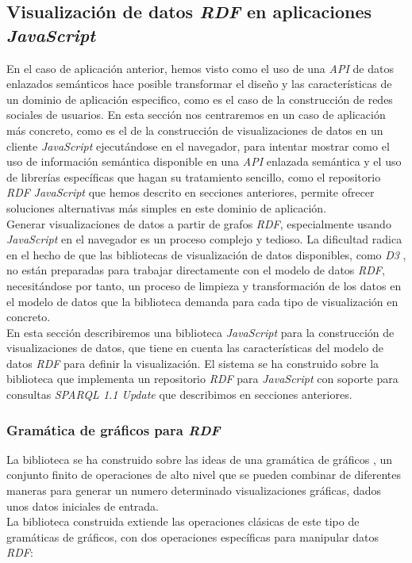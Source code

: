 \subsection{Visualizaci\'on de datos \textit{RDF} en aplicaciones \textit{JavaScript}}

En el caso de aplicaci\'on anterior, hemos visto como el uso de una \textit{API} de datos enlazados sem\'anticos hace posible transformar el dise\~no y las caracter\'isticas de un dominio de aplicaci\'on especifico, como es el caso de la construcci\'on de redes sociales de usuarios. En esta secci\'on nos centraremos en un caso de aplicaci\'on m\'as concreto, como es el de la construcci\'on de visualizaciones de datos en un cliente \textit{JavaScript} ejecut\'andose en el navegador, para intentar mostrar como el uso de informaci\'on sem\'antica disponible en una \textit{API} enlazada sem\'antica y el uso de librer\'ias espec\'ificas que hagan su tratamiento sencillo, como el repositorio \textit{RDF} \textit{JavaScript} que hemos descrito en secciones anteriores, permite ofrecer soluciones alternativas m\'as simples en este dominio de aplicaci\'on.\\
Generar visualizaciones de datos a partir de grafos \textit{RDF}, especialmente usando \textit{JavaScript} en el navegador es un proceso complejo y tedioso. La dificultad radica en el hecho de que las bibliotecas de visualizaci\'on de datos disponibles, como \textit{D3} \cite{d3}, no est\'an preparadas para trabajar directamente con el modelo de datos \textit{RDF}, necesit\'andose por tanto, un proceso de limpieza y transformaci\'on de los datos en el modelo de datos que la biblioteca demanda para cada tipo de visualizaci\'on en concreto.\\
En esta secci\'on describiremos una biblioteca \textit{JavaScript} para la construcci\'on de visualizaciones de datos, que tiene en cuenta las caracter\'isticas del modelo de datos \textit{RDF} para definir la visualizaci\'on. El sistema se ha construido sobre la biblioteca que implementa un repositorio \textit{RDF} para \textit{JavaScript} con soporte para consultas \textit{SPARQL 1.1 Update} que describimos en secciones anteriores.

\subsubsection{Gram\'atica de gr\'aficos para \textit{RDF}}

La biblioteca se ha construido sobre las ideas de una gram\'atica de gr\'aficos \cite{wilkinson2012grammar}, un conjunto finito de operaciones de alto nivel que se pueden combinar de diferentes maneras para generar un numero determinado visualizaciones gr\'aficas, dados unos datos iniciales de entrada.\\
La biblioteca construida extiende las operaciones cl\'asicas de este tipo de gram\'aticas de gr\'aficos,  con dos operaciones espec\'ificas para manipular datos \textit{RDF}:

